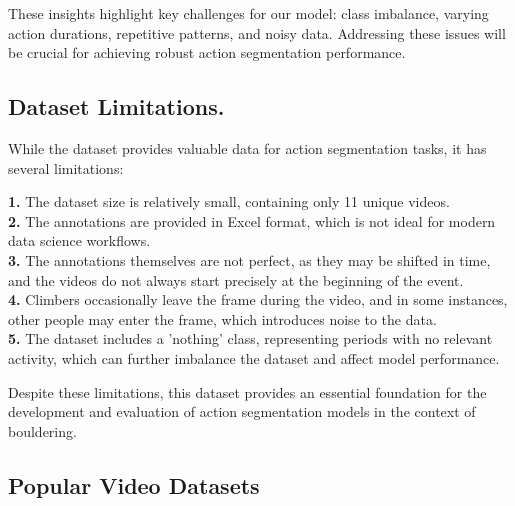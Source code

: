 These insights highlight key challenges for our model: class imbalance, varying action durations, repetitive patterns, and noisy data. Addressing these issues will be crucial for achieving robust action segmentation performance.

\subsection{Dataset Limitations.}
\label{subsection:dataset-limitations}
While the dataset provides valuable data for action segmentation tasks, it has several limitations: 

\textbf{1.} The dataset size is relatively small, containing only 11 unique videos.
\\
\textbf{2.} The annotations are provided in Excel format, which is not ideal for modern data science workflows.
\\
\textbf{3.} The annotations themselves are not perfect, as they may be shifted in time, and the videos do not always start precisely at the beginning of the event.
\\
\textbf{4.} Climbers occasionally leave the frame during the video, and in some instances, other people may enter the frame, which introduces noise to the data.
\\
\textbf{5.} The dataset includes a 'nothing' class, representing periods with no relevant activity, which can further imbalance the dataset and affect model performance.  

Despite these limitations, this dataset provides an essential foundation for the development and evaluation of action segmentation models in the context of bouldering.

\subsection{Popular Video Datasets}

\label{subsection:popular-video-datasets}

